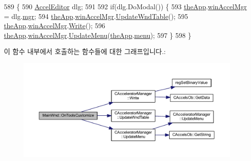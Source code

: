 \begin{DoxyCode}
589 \{
590   \mbox{\hyperlink{class_accel_editor}{AccelEditor}} dlg;
591 
592   \textcolor{keywordflow}{if}(dlg.DoModal()) \{
593     \mbox{\hyperlink{_v_b_a_8cpp_a8095a9d06b37a7efe3723f3218ad8fb3}{theApp}}.\mbox{\hyperlink{class_v_b_a_ad7ebce057dbde0ca88cee75e84721a89}{winAccelMgr}} = dlg.\mbox{\hyperlink{class_accel_editor_acb731e2193cb5022a95e83122651f96d}{mgr}};
594     \mbox{\hyperlink{_v_b_a_8cpp_a8095a9d06b37a7efe3723f3218ad8fb3}{theApp}}.\mbox{\hyperlink{class_v_b_a_ad7ebce057dbde0ca88cee75e84721a89}{winAccelMgr}}.\mbox{\hyperlink{class_c_accelerator_manager_a3fa9c8e4f44acc76cc40fc7382e597d8}{UpdateWndTable}}();
595     \mbox{\hyperlink{_v_b_a_8cpp_a8095a9d06b37a7efe3723f3218ad8fb3}{theApp}}.\mbox{\hyperlink{class_v_b_a_ad7ebce057dbde0ca88cee75e84721a89}{winAccelMgr}}.\mbox{\hyperlink{class_c_accelerator_manager_a6ddd05a54ab0e66bc6ca8a7af3742e61}{Write}}();
596     \mbox{\hyperlink{_v_b_a_8cpp_a8095a9d06b37a7efe3723f3218ad8fb3}{theApp}}.\mbox{\hyperlink{class_v_b_a_ad7ebce057dbde0ca88cee75e84721a89}{winAccelMgr}}.\mbox{\hyperlink{class_c_accelerator_manager_ac7411d20f413ea0ec3bd65705b564adf}{UpdateMenu}}(\mbox{\hyperlink{_v_b_a_8cpp_a8095a9d06b37a7efe3723f3218ad8fb3}{theApp}}.\mbox{\hyperlink{class_v_b_a_acf9d855b5b959a2df9c6cb21b888366e}{menu}});
597   \}
598 \}
\end{DoxyCode}
이 함수 내부에서 호출하는 함수들에 대한 그래프입니다.\+:
\nopagebreak
\begin{figure}[H]
\begin{center}
\leavevmode
\includegraphics[width=350pt]{class_main_wnd_a37f9cc51f47fe32648f937b8ff64e955_cgraph}
\end{center}
\end{figure}
\mbox{\label{class_main_wnd_af61485d2b07b79fb1efc1cc6437d1ab1}} 
